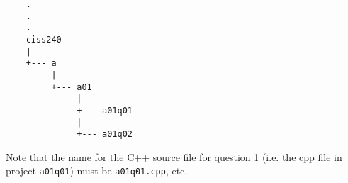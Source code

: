 \begin{Verbatim}
    .
    .
    .
    ciss240
    |
    +--- a
         |
         +--- a01
              |
              +--- a01q01
              |
              +--- a01q02
\end{Verbatim}

Note that the name for the C++ source file for question 1 
(i.e. the cpp file in 
project \verb!a01q01!) must be \verb!a01q01.cpp!, etc.




